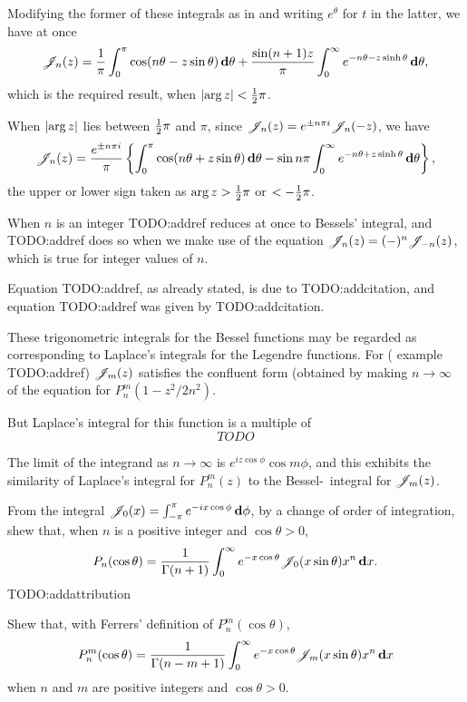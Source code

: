 \documentclass{book}
\begin{document}
Modifying the former of these integrals as in
 and writing 
$e^{\theta}$ for $t$ in the latter, we have at once
$$
\mathscr{J}_n(z)
=
\frac{1}{\pi}
\int_0^{\pi}
\cos(n\theta - z\sin\theta)
\, \mathbf{d}\theta
+
\frac{\sin(n+1)z}{\pi}
\int_0^{\infty}
e^{-n\theta - z\sinh\theta}
\, \mathbf{d} \theta,
$$
which is the required result, when
$\left| \arg z \right| < \frac{1}{2} \pi$.

When $\left|  \arg z  \right|$ lies between $\frac{1}{2} \pi$ and $\pi$, since 
$\mathscr{J}_n(z) = e^{\pm n\pi i} \mathscr{J}_n(-z)$, we have
\begin{equation}
  \mathscr{J}_n(z)
  =
  \frac{e^{\pm n \pi i}}{\pi}
  \left\{ 
    \int_0^{\pi} \cos(n\theta + z\sin\theta) \, \mathbf{d}\theta
    -
    \sin n\pi \int_0^{\infty} e^{-n\theta + z\sinh\theta} \, \mathbf{d}\theta
   \right\},
\end{equation}
the upper or lower sign taken as
$\arg z > \frac{1}{2} \pi$ or $< -\frac{1}{2} \pi$.

When $n$ is an integer TODO:addref reduces at once to Bessels'
integral, and TODO:addref does so when we make use of the equation 
$\mathscr{J}_n(z) = (-)^n \mathscr{J}_{-n}(z)$, which is true for integer values of $n$.

% 
% 
Equation TODO:addref, as already stated, is due to TODO:addcitation,
and equation TODO:addref was given by TODO:addcitation.

These trigonometric integrals for the Bessel functions may be regarded
as corresponding to Laplace's integrals for the Legendre functions.
For ( example TODO:addref)
$\mathscr{J}_m(z)$ satisfies the confluent form (obtained by making 
$n \rightarrow \infty$ of the equation for
$P_n^m(1-z^2/2n^2)$.

But Laplace's integral for this function is a multiple of 
$$
TODO
$$

The limit of the integrand as $n \rightarrow \infty$ is 
$e^{iz\cos\phi}\cos m\phi$, and this exhibits the similarity of
Laplace's integral for $P_n^m(z)$ to the Bessel-\Schlafli\ integral for 
$\mathscr{J}_m(z)$.
\begin{wandwexample}
  From the integral
  $\mathscr{J}_0(x) = \int_{-\pi}^{\pi} e^{-ix\cos\phi}\, \mathbf{d}\phi$, by a
  change of order of integration, shew that, when $n$ is a positive
  integer and $\cos\theta > 0$,
  $$
  P_n(\cos\theta)
  =
  \frac{1}{\Gamma(n+1)}
  \int_0^{\infty}
  e^{-x\cos\theta}
  \mathscr{J}_0(x\sin\theta)
  x^n
  \, \mathbf{d} x.
  $$
  TODO:addattribution
\end{wandwexample}
\begin{wandwexample}
  Shew that, with Ferrers' definition of $P_n^m(\cos\theta)$,
  $$
  P_n^m(\cos\theta)
  =
  \frac{1}{\Gamma(n-m+1)}
  \int_0^{\infty}
  e^{-x\cos\theta}
  \mathscr{J}_m(x\sin\theta)
  x^n
  \, \mathbf{d} x
  $$
  when $n$ and $m$ are positive integers and
  $\cos\theta > 0$.
\end{wandwexample}
\end{document}
